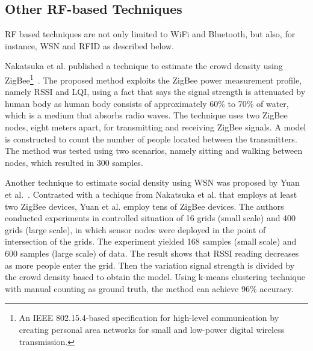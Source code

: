 	









	\subsection{Other RF-based Techniques} %
	\label{sub:other_rf_techniques}
	\ac{RF} based techniques are not only limited to WiFi and Bluetooth, but also, for instance, \ac{WSN} and \ac{RFID} as described below.

	Nakatsuka et al. published a technique to estimate the crowd density using ZigBee\footnote{An IEEE 802.15.4-based specification for high-level communication by creating personal area networks for small and low-power digital wireless transmission.}~\cite{thesis042}. The proposed method exploits the ZigBee power measurement profile, namely \ac{RSSI} and \ac{LQI}, using a fact that says the signal strength is attenuated by human body as human body consists of approximately 60\% to 70\% of water, which is a medium that absorbs radio waves. The technique uses two ZigBee nodes, eight meters apart, for transmitting and receiving ZigBee signals. A model is constructed to count the number of people located between the transmitters. The method was tested using two scenarios, namely sitting and walking between nodes, which resulted in 300 samples.
	
	Another technique to estimate social density using \ac{WSN} was proposed by Yuan et al.~\cite{thesis043}. Contrasted with a techique from Nakatsuka et al. that employs at least two ZigBee devices, Yuan et al. employ tens of ZigBee devices.
	The authors conducted experiments in controlled situation of 16 grids (small scale) and 400 grids (large scale), in which sensor nodes were deployed in the point of intersection of the grids. The experiment yielded 168 samples (small scale) and 600 samples (large scale) of data. The result shows that \ac{RSSI} reading decreases as more people enter the grid. Then the variation signal strength is divided by the crowd density based to obtain the model. Using k-means clustering technique with manual counting as ground truth, the method can achieve 96\% accuracy.


